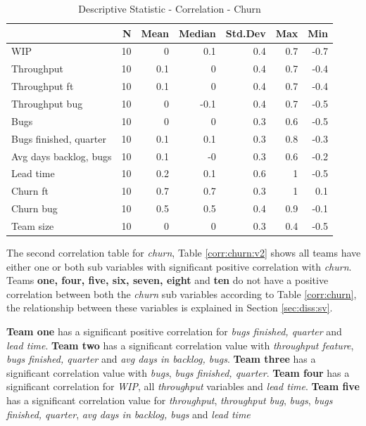 \documentclass[UKenglish]{ifimaster}  %
\begin{document}
\begin{minipage}[t]{\linewidth}
\begin{table}[H]
\centering
 \begin{tabular}{ | l | r | r | r | r | r | r | }
 \hline
& \bf{N} & \bf{Mean} & \bf{Median} & \bf{Std.Dev} & \bf{Max} & \bf{Min} \\ \hline
WIP  & 10 & 0 & 0.1 & 0.4 & 0.7 & -0.7\\ \hline
Throughput  & 10 & 0.1 & 0 & 0.4 & 0.7 & -0.4\\ \hline
Throughput ft  & 10 & 0.1 & 0 & 0.4 & 0.7 & -0.4\\ \hline
Throughput bug  & 10 & 0 & -0.1 & 0.4 & 0.7 & -0.5\\ \hline
Bugs  & 10 & 0 & 0 & 0.3 & 0.6 & -0.5\\ \hline
Bugs finished, quarter  & 10 & 0.1 & 0.1 & 0.3 & 0.8 & -0.3\\ \hline
Avg days backlog, bugs  & 10 & 0.1 & -0 & 0.3 & 0.6 & -0.2\\ \hline
Lead time & 10 & 0.2 & 0.1 & 0.6 & 1 & -0.5\\ \hline
Churn ft  & 10 & 0.7 & 0.7 & 0.3 & 1 & 0.1\\ \hline
Churn bug  & 10 & 0.5 & 0.5 & 0.4 & 0.9 & -0.1\\ \hline
Team size  & 10 & 0 & 0 & 0.3 & 0.4 & -0.5\\ \hline
\end{tabular}
 \caption{Descriptive Statistic - Correlation - Churn}
 \label{DS:corr:Churn}
  \end{table}
  \end{minipage}
 
The second correlation table for \textit{churn}, Table \ref{corr:churn:v2} shows all teams have either one or both sub variables with significant positive correlation with \textit{churn}. Teams \textbf{one, four, five, six, seven, eight} and \textbf{ten} do not have a positive correlation between both the \textit{churn} sub variables according to Table \ref{corr:churn}, the relationship between these variables is explained in Section \ref{sec:diss:sv}. 

\textbf{Team one} has a significant positive correlation for \textit{bugs finished, quarter} and \textit{lead time}.  \textbf{Team two} has a significant correlation value with \textit{throughput feature}, \textit{bugs finished, quarter} and \textit{avg days in backlog, bugs}. \textbf{Team three} has a significant correlation value with \textit{bugs}, \textit{bugs finished, quarter}.  \textbf{Team four} has a significant correlation for \textit{WIP}, all \textit{throughput} variables and \textit{lead time}. \textbf{Team five} has a significant correlation value for \textit{throughput}, \textit{throughput bug}, \textit{bugs}, \textit{bugs finished, quarter}, \textit{avg days in backlog, bugs} and \textit{lead time} 
\end{document}
